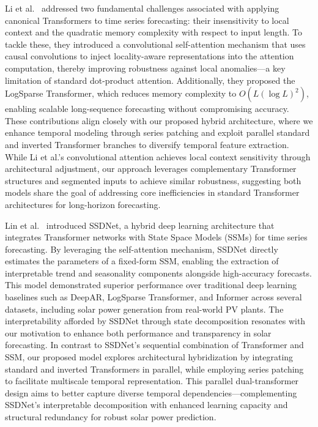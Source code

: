 \documentclass[12pt]{uomthesis}
\begin{document}
Li et al.~\cite{li2019enhancing} addressed two fundamental challenges associated with applying canonical Transformers to time series forecasting: their insensitivity to local context and the quadratic memory complexity with respect to input length. To tackle these, they introduced a convolutional self-attention mechanism that uses causal convolutions to inject locality-aware representations into the attention computation, thereby improving robustness against local anomalies—a key limitation of standard dot-product attention. Additionally, they proposed the LogSparse Transformer, which reduces memory complexity to $O(L(\log L)^2)$, enabling scalable long-sequence forecasting without compromising accuracy. These contributions align closely with our proposed hybrid architecture, where we enhance temporal modeling through series patching and exploit parallel standard and inverted Transformer branches to diversify temporal feature extraction. While Li et al.'s convolutional attention achieves local context sensitivity through architectural adjustment, our approach leverages complementary Transformer structures and segmented inputs to achieve similar robustness, suggesting both models share the goal of addressing core inefficiencies in standard Transformer architectures for long-horizon forecasting.

Lin et al.~\cite{lin2021ssdnet} introduced SSDNet, a hybrid deep learning architecture that integrates Transformer networks with State Space Models (SSMs) for time series forecasting. By leveraging the self-attention mechanism, SSDNet directly estimates the parameters of a fixed-form SSM, enabling the extraction of interpretable trend and seasonality components alongside high-accuracy forecasts. This model demonstrated superior performance over traditional deep learning baselines such as DeepAR, LogSparse Transformer, and Informer across several datasets, including solar power generation from real-world PV plants. The interpretability afforded by SSDNet through state decomposition resonates with our motivation to enhance both performance and transparency in solar forecasting. In contrast to SSDNet’s sequential combination of Transformer and SSM, our proposed model explores architectural hybridization by integrating standard and inverted Transformers in parallel, while employing series patching to facilitate multiscale temporal representation. This parallel dual-transformer design aims to better capture diverse temporal dependencies—complementing SSDNet’s interpretable decomposition with enhanced learning capacity and structural redundancy for robust solar power prediction.
\end{document}
